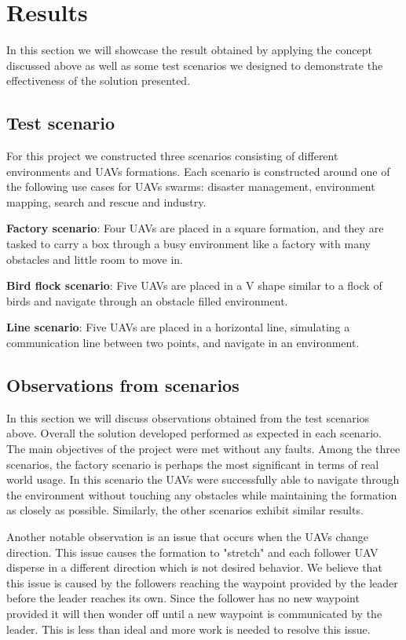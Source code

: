 \chapter{Results}

In this section we will showcase the result obtained by applying the concept discussed above as well as some test
scenarios we designed to demonstrate the effectiveness of the solution presented. 

\section{Test scenario}

For this project we constructed three scenarios consisting of different environments and UAVs formations. Each 
scenario is constructed around one of the following use cases for UAVs swarms: disaster management, environment
mapping, search and rescue and industry.

\textbf{Factory scenario}: Four UAVs are placed in a square formation, and they are tasked to carry a box through a 
busy environment like a factory with many obstacles and little room to move in. 

\textbf{Bird flock scenario}: Five UAVs are placed in a V shape similar to a flock of birds and navigate through an
obstacle filled environment.

\textbf{Line scenario}: Five UAVs are placed in a horizontal line, simulating a communication line between two points, and 
navigate in an environment.

\section{Observations from scenarios}

In this section we will discuss observations obtained from the test scenarios above. 
Overall the solution developed performed as expected in each scenario. The main objectives
of the project were met without any faults. Among the three scenarios, the factory
scenario is perhaps the most significant in terms of real world usage. In this scenario
the UAVs were successfully able to navigate through the environment without touching
any obstacles while maintaining the formation as closely as possible. Similarly, 
the other scenarios exhibit similar results. 

Another notable observation is an issue that occurs when the UAVs change direction. 
This issue causes the formation to "stretch" and each follower UAV disperse in a 
different direction which is not desired behavior. We believe that this issue is
caused by the followers reaching the waypoint provided by the leader before the 
leader reaches its own. Since the follower has no new waypoint provided it will then 
wonder off until a new waypoint is communicated by the leader. This is less than
ideal and more work is needed to resolve this issue.

